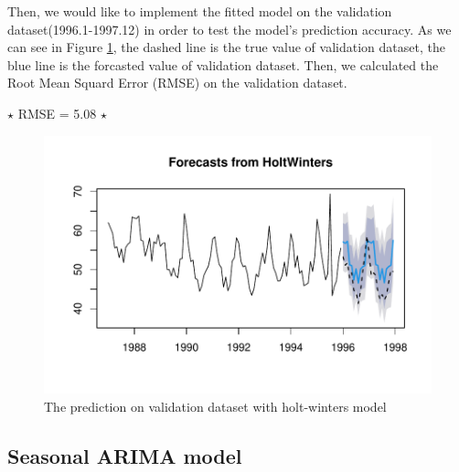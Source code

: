 \documentclass{article}
\begin{document}
Then, we would like to implement the fitted model on the validation dataset(1996.1-1997.12) in order to test the model's prediction accuracy. As we can see in Figure \ref{val}, the dashed line is the true 
value of validation dataset, the blue line is the forcasted value of validation dataset. Then, we calculated the Root Mean Squard Error (RMSE) on the validation dataset. 

$\star$ RMSE = 5.08 $\star$
\begin{figure}[H]
    \centering
    \includegraphics[width=0.65\linewidth]{images/cvd-hw-val}
    \caption{The prediction on validation dataset with holt-winters model}
    \label{val}
\end{figure}

\vspace{4pt}
\subsection{Seasonal ARIMA model}
\end{document}

